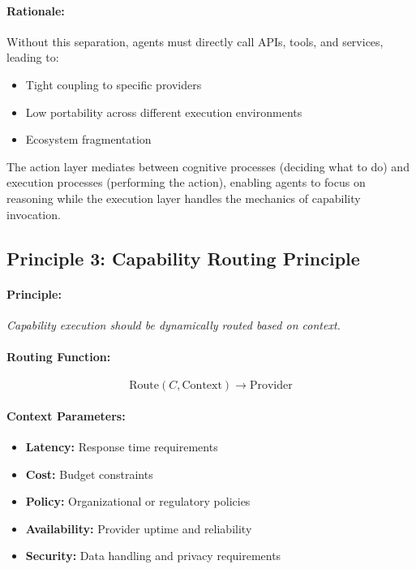 \paragraph{Rationale:}
Without this separation, agents must directly call APIs, tools, and services, leading to:
\begin{itemize}[leftmargin=*,nosep]
  \item Tight coupling to specific providers
  \item Low portability across different execution environments
  \item Ecosystem fragmentation
\end{itemize}

The action layer mediates between cognitive processes (deciding what to do) and execution processes (performing the action), enabling agents to focus on reasoning while the execution layer handles the mechanics of capability invocation.

\subsection{Principle 3: Capability Routing Principle}

\paragraph{Principle:}
\emph{Capability execution should be dynamically routed based on context.}

\paragraph{Routing Function:}
\begin{equation}
\mathrm{Route}(C, \mathrm{Context}) \rightarrow \mathrm{Provider}
\label{eq:routing}
\end{equation}

\paragraph{Context Parameters:}
\begin{itemize}[leftmargin=*,nosep]
  \item \textbf{Latency:} Response time requirements
  \item \textbf{Cost:} Budget constraints
  \item \textbf{Policy:} Organizational or regulatory policies
  \item \textbf{Availability:} Provider uptime and reliability
  \item \textbf{Security:} Data handling and privacy requirements
\end{itemize}

